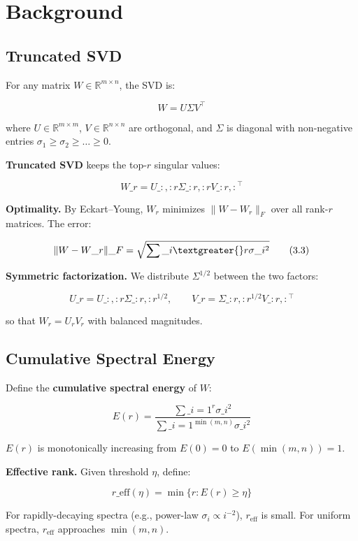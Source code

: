 
\section{Background}

\subsection{Truncated SVD}

For any matrix $W \in \mathbb{R}^{m \times n}$, the SVD is:

\[
W = U \Sigma V^\top
\tag{3.1}
\]

where $U \in \mathbb{R}^{m \times m}$, $V \in \mathbb{R}^{n \times n}$ are 
orthogonal, and $\Sigma$ is diagonal with non-negative entries 
$\sigma_1 \geq \sigma_2 \geq \dots \geq 0$.

\textbf{Truncated SVD} keeps the top-$r$ singular values:

\[
W\_r = U\_{:, :r} \Sigma\_{:r, :r} V\_{:r, :}^\top
\tag{3.2}
\]

\textbf{Optimality.} By Eckart--Young, $W_r$ minimizes $\|W - W_r\|_F$ over all 
rank-$r$ matrices. The error:

\[
\|W - W\_r\|\_F = \sqrt{\sum\_{i \textgreater{} r} \sigma\_i^2}
\tag{3.3}
\]

\textbf{Symmetric factorization.} We distribute $\Sigma^{1/2}$ between the two 
factors:

\[
U\_r = U\_{:, :r} \Sigma\_{:r, :r}^{1/2}, \qquad
V\_r = \Sigma\_{:r, :r}^{1/2} V\_{:r, :}^\top
\tag{3.4}
\]

so that $W_r = U_r V_r$ with balanced magnitudes.

\subsection{Cumulative Spectral Energy}

Define the \textbf{cumulative spectral energy} of $W$:

\[
E(r) = \frac{\sum\_{i=1}^{r} \sigma\_i^2}{\sum\_{i=1}^{\min(m, n)} \sigma\_i^2}
\tag{3.5}
\]

$E(r)$ is monotonically increasing from $E(0) = 0$ to $E(\min(m, n)) = 1$.

\textbf{Effective rank.} Given threshold $\eta$, define:

\[
r\_\text{eff}(\eta) = \min\{r : E(r) \geq \eta\}
\tag{3.6}
\]

For rapidly-decaying spectra (e.g., power-law $\sigma_i \propto i^{-2}$), 
$r_\text{eff}$ is small. For uniform spectra, $r_\text{eff}$ approaches 
$\min(m, n)$.

